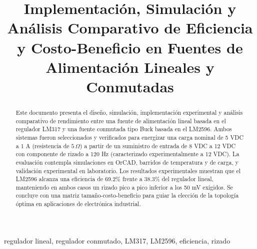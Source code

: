 \documentclass[conference]{IEEEtran}
\begin{document}
\title{Implementación, Simulación y Análisis Comparativo de Eficiencia y Costo-Beneficio en Fuentes de Alimentación Lineales y Conmutadas}

\author{
\and
{}
}

\maketitle

\begin{abstract}
Este documento presenta el diseño, simulación, implementación experimental y análisis comparativo de rendimiento entre una fuente de alimentación lineal basada en el regulador LM317 y una fuente conmutada tipo Buck basada en el LM2596. Ambos sistemas fueron seleccionados y verificados para energizar una carga nominal de 5 VDC a 1 A (resistencia de $5\,\Omega$) a partir de un suministro de entrada de 8 VDC a 12 VDC con componente de rizado a 120 Hz (caracterizado experimentalmente a 12 VDC). La evaluación contempla simulaciones en OrCAD, barridos de temperatura y de carga, y validación experimental en laboratorio. Los resultados experimentales muestran que el LM2596 alcanza una eficiencia de 69.2\% frente a 38.3\% del regulador lineal, manteniendo en ambos casos un rizado pico a pico inferior a los 50 mV exigidos. Se concluye con una matriz tamaño-costo-beneficio para guiar la elección de la topología óptima en aplicaciones de electrónica industrial.
\end{abstract}

\smallskip
\begin{IEEEkeywords}
regulador lineal, regulador conmutado, LM317, LM2596, eficiencia, rizado
\end{IEEEkeywords}

\end{document}
